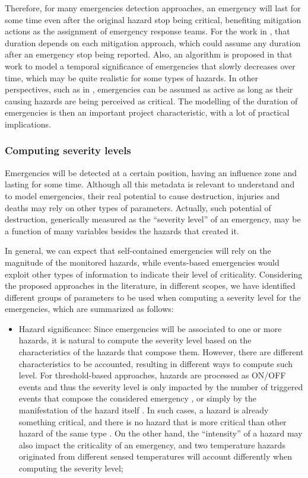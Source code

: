 \begin{refsection}
Therefore, for many emergencies detection approaches, an emergency will last for some time even after the original hazard stop being critical, benefiting mitigation actions as the assignment of emergency response teams. For the work in \cite{emergenciesmetric2}, that duration depends on each mitigation approach, which could assume any duration after an emergency stop being reported. Also, an algorithm is proposed in that work to model a temporal significance of emergencies that slowly decreases over time, which may be quite realistic for some types of hazards. In other perspectives, such as in \cite{socialmedia1,emergenciesmetric4,emergenciestimemedia}, emergencies can be assumed as active as long as their causing hazards are being perceived as critical. The modelling of the duration of emergencies is then an important project characteristic, with a lot of practical implications.

\subsubsection{Computing severity levels} 

Emergencies will be detected at a certain position, having an influence zone and lasting for some time. Although all this metadata is relevant to understand and to model emergencies, their real potential to cause destruction, injuries and deaths may rely on other types of parameters. Actually, such potential of destruction, generically measured as the ``severity level'' of an emergency, may be a function of many variables besides the hazards that created it.

In general, we can expect that self-contained emergencies will rely on the magnitude of the monitored hazards, while events-based emergencies would exploit other types of information to indicate their level of criticality. Considering the proposed approaches in the literature, in different scopes, we have identified different groups of parameters to be used when computing a severity level for the emergencies, which are summarized as follows:

\begin{itemize}
  \item Hazard significance: Since emergencies will be associated to one or more hazards, it is natural to compute the severity level based on the characteristics of the hazards that compose them. However, there are different characteristics to be accounted, resulting in different ways to compute such level. For threshold-based approaches, hazards are processed as ON/OFF events and thus the severity level is only impacted by the number of triggered events that compose the considered emergency \cite{emergenciesmetric2}, or simply by the manifestation of the hazard itself \cite{emergenciesmetric4}. In such cases, a hazard is already something critical, and there is no hazard that is more critical than other hazard of the same type \cite{emergenciesmetric2}. On the other hand, the ``intensity'' of a hazard may also impact the criticality of an emergency, and two temperature hazards originated from different sensed temperatures will account differently when computing the severity level;
  

\end{itemize}
\end{refsection}
